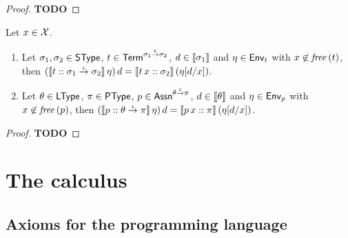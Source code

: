 \documentclass[12pt,a4paper]{report}
\begin{document}
\begin{proof}
  {\bf TODO}
\end{proof}

\begin{theorem} \label{theorem:Application}
  Let $x\in\mathcal{X}$.
  \begin{enumerate}
    \item Let $\sigma_1,\sigma_2\in\mathsf{SType}$, $t\in\mathsf{Term}^{\sigma_1\stackrel{_t}{\to}\sigma_2}$,
          $d \in \llbracket\sigma_1\rrbracket$ and $\eta\in\mathsf{Env}_t$ with $x \not\in \mathit{free}\,(t)$, then
          $(\llbracket{t}\mathrel{::}{\sigma_1\stackrel{_t}{\to}\sigma_2}\rrbracket\,\eta)\,d
           = \llbracket{t\,x}\mathrel{::}{\sigma_2}\rrbracket\,(\eta[d/x])$.
    \item Let $\theta \in \mathsf{LType}$, $\pi\in\mathsf{PType}$, $p\in\mathsf{Assn}^{\theta\stackrel{_t}{\to}\pi}$,
          $d\in\llbracket\theta\rrbracket$ and $\eta\in\mathsf{Env}_p$ with $x \not\in \mathit{free}\,(p)$, then
          $(\llbracket{p}\mathrel{::}{\theta\stackrel{_t}{\to}\pi}\rrbracket\,\eta)\,d
           = \llbracket{p\,x}\mathrel{::}{\pi}\rrbracket\,(\eta[d/x])$.
  \end{enumerate}
\end{theorem}

\begin{proof}
  {\bf TODO}
\end{proof}



\chapter{The calculus}



\section{Axioms for the programming language}
\end{document}
